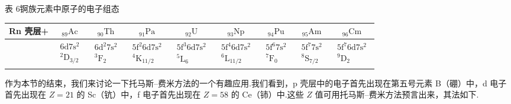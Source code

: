 \begin{center}
{\heiti 表 6}\quad 锕族元素中原子的电子组态\\[0.8em]
\small\setlength{\tabcolsep}{2.5pt}%
\begin{tabular}{|c||c|c|c|c|c|c|c|c|}
\hline
Rn 壳层+ & ${}_{89}\mathrm{Ac}$ & ${}_{90}\mathrm{Th}$ & ${}_{91}\mathrm{Pa}$ & ${}_{92}\mathrm{U}$ & ${}_{93}\mathrm{Np}$ & ${}_{94}\mathrm{Pu}$ & ${}_{95}\mathrm{Am}$ & ${}_{96}\mathrm{Cm}$\\
\hline
 & $\begin{array}{c}6\mathrm{d}7\mathrm{s}^{2}\\{}^{2}\mathrm{D}_{3/2}\end{array}$ &
$\begin{array}{c}6\mathrm{d}^{2}7\mathrm{s}^{2}\\{}^{3}\mathrm{F}_{2}\end{array}$ &
$\begin{array}{c}5\mathrm{f}^{2}6\mathrm{d}7\mathrm{s}^{2}\\{}^{4}\mathrm{K}_{11/2}\end{array}$ &
$\begin{array}{c}5\mathrm{f}^{3}6\mathrm{d}7\mathrm{s}^{2}\\{}^{5}\mathrm{L}_{6}\end{array}$ &
$\begin{array}{c}5\mathrm{f}^{4}6\mathrm{d}7\mathrm{s}^{2}\\{}^{6}\mathrm{L}_{11/2}\end{array}$ &
$\begin{array}{c}5\mathrm{f}^{6}7\mathrm{s}^{2}\\{}^{7}\mathrm{F}_{0}\end{array}$ &
$\begin{array}{c}5\mathrm{f}^{7}7\mathrm{s}^{2}\\{}^{8}\mathrm{S}_{7/2}\end{array}$ &
$\begin{array}{c}5\mathrm{f}^{7}6\mathrm{d}7\mathrm{s}^{2}\\{}^{9}\mathrm{D}_{2}\end{array}$\\
\hline
\end{tabular}
\end{center}

作为本节的结束，我们来讨论一下托马斯–费米方法的一个有趣应用.我们看到，p 壳层中的电子首先出现在第五号元素 B（硼）中，d 电子首先出现在 $Z=21$ 的 Sc（钪）中，f 电子首先出现在 $Z=58$ 的 Ce（铈）中.这些 $Z$ 值可用托马斯–费米方法预言出来，其法如下.

